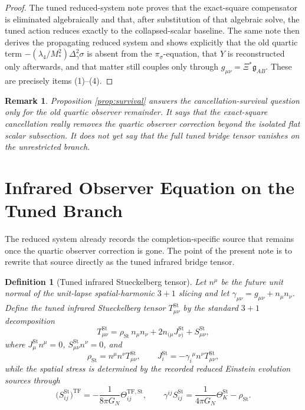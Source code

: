 \documentclass[11pt]{article}
\newcommand{\BridgeMetric}{\mathfrak{g}}
\newtheorem{definition}{Definition}
\newtheorem{remark}{Remark}
\begin{document}
\begin{proof}
The tuned reduced-system note proves that the exact-square compensator is eliminated algebraically and that, after substitution of that algebraic solve, the tuned action reduces exactly to the collapsed-scalar baseline. The same note then derives the propagating reduced system and shows explicitly that the old quartic term \(-(\lambda_4/M_*^2)\Delta_\gamma^2\sigma\) is absent from the \(\pi_\sigma\)-equation, that \(Y\) is reconstructed only afterwards, and that matter still couples only through \(g_{\mu\nu}=\Xi^\ast\BridgeMetric_{AB}\). These are precisely items (1)--(4).
\end{proof}

\begin{remark}
Proposition \ref{prop:survival} answers the cancellation-survival question only for the old quartic observer remainder. It says that the exact-square cancellation really removes the quartic observer correction beyond the isolated flat scalar subsection. It does \emph{not} yet say that the full tuned bridge tensor vanishes on the unrestricted branch.
\end{remark}

\section{Infrared Observer Equation on the Tuned Branch}

The reduced system already records the completion-specific source that remains once the quartic observer correction is gone. The point of the present note is to rewrite that source directly as the tuned infrared bridge tensor.

\begin{definition}[Tuned infrared Stueckelberg tensor]
\label{def:Tst}
Let \(n^\mu\) be the future unit normal of the unit-lapse spatial-harmonic \(3+1\) slicing and let \(\gamma_{\mu\nu}=g_{\mu\nu}+n_\mu n_\nu\). Define the \emph{tuned infrared Stueckelberg tensor} \(T_{\mu\nu}^{\mathrm{St}}\) by the standard \(3+1\) decomposition
\begin{equation}
T_{\mu\nu}^{\mathrm{St}}
=
\rho_{\mathrm{St}}\,n_\mu n_\nu
+2n_{(\mu}J_{\nu)}^{\mathrm{St}}
+S_{\mu\nu}^{\mathrm{St}},
\label{eq:Tst}
\end{equation}
where \(J_\mu^{\mathrm{St}}n^\mu=0\), \(S_{\mu\nu}^{\mathrm{St}}n^\nu=0\), and
\begin{equation}
\rho_{\mathrm{St}}
=
n^\mu n^\nu T_{\mu\nu}^{\mathrm{St}},
\qquad
J_i^{\mathrm{St}}
=
-\gamma_i{}^\mu n^\nu T_{\mu\nu}^{\mathrm{St}},
\label{eq:rhoJ}
\end{equation}
while the spatial stress is determined by the recorded reduced Einstein evolution sources through
\begin{equation}
\bigl(S_{ij}^{\mathrm{St}}\bigr)^{\mathrm{TF}}
=
-\frac{1}{8\pi G_N}\Theta_{ij}^{\mathrm{TF,St}},
\qquad
\gamma^{ij}S_{ij}^{\mathrm{St}}
=
\frac{1}{4\pi G_N}\Theta_K^{\mathrm{St}}-\rho_{\mathrm{St}}.
\label{eq:Sij}
\end{equation}
\end{definition}
\end{document}
